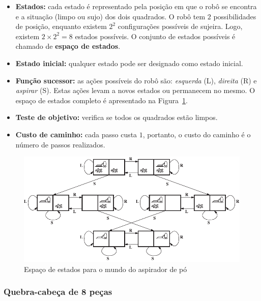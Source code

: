 \begin{itemize}
	\item \textbf{Estados:} cada estado é representado pela posição em que o robô se encontra e a situação (limpo ou sujo) dos dois quadrados. O robô tem $2$ possibilidades de posição, enquanto existem $2^2$ configurações possíveis de sujeira. Logo, existem $2 \times 2^2 = 8$ estados possíveis. O conjunto de estados possíveis é chamado de \textbf{espaço de estados}.
	
	\item \textbf{Estado inicial:} qualquer estado pode ser designado como estado inicial.
	
	\item \textbf{Função sucessor:} as ações possíveis do robô são: \textit{esquerda} (L), \textit{direita} (R) e \textit{aspirar} (S). Estas ações levam a novos estados ou permanecem no mesmo. O espaço de estados completo é apresentado na Figura~\ref{fig:espaco-estados-aspirador}.
	
	\item \textbf{Teste de objetivo:} verifica se todos os quadrados estão limpos.
	
	\item \textbf{Custo de caminho:} cada passo custa $1$, portanto, o custo do caminho é o número de passos realizados.
\end{itemize}

\begin{figure}[h]
	\centering
	\includegraphics[width=\textwidth]{img/espaco-estados-aspirador}
	\caption{Espaço de estados para o mundo do aspirador de pó}
	\label{fig:espaco-estados-aspirador}
\end{figure}

\subsubsection{Quebra-cabeça de 8 peças}

